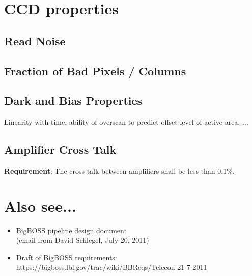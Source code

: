 \documentclass[12pt]{article}
\begin{document}
\section{CCD properties}
\subsection{Read Noise}

\subsection{Fraction of Bad Pixels / Columns}

\subsection{Dark and Bias Properties}
Linearity with time, ability of overscan to predict offset level of
active area, ...

\subsection{Amplifier Cross Talk}
\label{sec:ccd_amp_xtalk}
{\bf Requirement}: The cross talk between amplifiers shall be less than 0.1\%.

\section{Also see...}

\begin{itemize}
    \item BigBOSS pipeline design document \\
        (email from David Schlegel, July 20, 2011)
    \item Draft of BigBOSS requirements: \\
        https://bigboss.lbl.gov/trac/wiki/BBReqs/Telecon-21-7-2011
\end{itemize}
\end{document}
